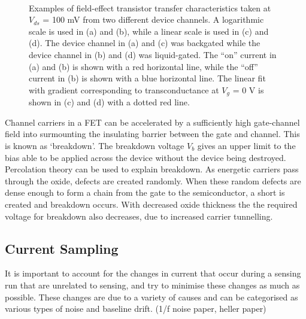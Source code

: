 \documentclass[
  a4paper,
]{scrbook}
\begin{document}
\begin{figure}
\begin{minipage}[t]{0.45\linewidth}
{{}

}

\end{minipage}%
%
\begin{minipage}[t]{0.01\linewidth}

{\centering 

~

}

\end{minipage}%

\caption{\label{fig-gating-transfer}Examples of field-effect transistor
transfer characteristics taken at \(V_{ds}\) = 100 mV from two different
device channels. A logarithmic scale is used in (a) and (b), while a
linear scale is used in (c) and (d). The device channel in (a) and (c)
was backgated while the device channel in (b) and (d) was liquid-gated.
The ``on'' current in (a) and (b) is shown with a red horizontal line,
while the ``off'' current in (b) is shown with a blue horizontal line.
The linear fit with gradient corresponding to transconductance at
\(V_g\) = 0 V is shown in (c) and (d) with a dotted red line.}

\end{figure}

Channel carriers in a FET can be accelerated by a sufficiently high
gate-channel field into surmounting the insulating barrier between the
gate and channel. This is known as `breakdown'. The breakdown voltage
\(V_b\) gives an upper limit to the bias able to be applied across the
device without the device being destroyed. Percolation theory can be
used to explain breakdown. As energetic carriers pass through the oxide,
defects are created randomly. When these random defects are dense enough
to form a chain from the gate to the semiconductor, a short is created
and breakdown occurs. With decreased oxide thickness the the required
voltage for breakdown also decreases, due to increased carrier
tunnelling.

\hypertarget{current-sampling}{%
\subsection{Current Sampling}\label{current-sampling}}

It is important to account for the changes in current that occur during
a sensing run that are unrelated to sensing, and try to minimise these
changes as much as possible. These changes are due to a variety of
causes and can be categorised as various types of noise and baseline
drift. (1/f noise paper, heller paper)
\end{document}

